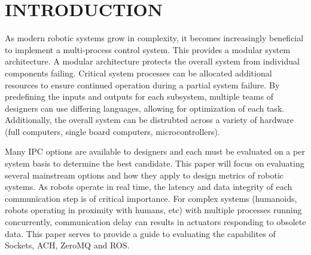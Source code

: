 \section{INTRODUCTION}

As modern robotic systems grow in complexity, it becomes increasingly beneficial to implement a multi-process control system. This provides a modular system architecture. A modular architecture protects the overall system from individual components failing. Critical system processes can be allocated additional resources to ensure continued operation during a partial system failure. By predefining the inputs and outputs for each subsystem, multiple teams of designers can use differing languages, allowing for optimization of each task. Additionally, the overall system can be distrubted across a variety of hardware (full computers, single board computers, microcontrollers). 

Many IPC options are available to designers and each must be evaluated on a per system basis to determine the best candidate. This paper will focus on evaluating several mainstream options and how they apply to design metrics of robotic systems. As robots operate in real time, the latency and data integrity of each communication step is of critical importance. For complex systems (humanoids, robots operating in proximity with humans, etc) with multiple processes running concurrently, communication delay can results in actuators responding to obsolete data. This paper serves to provide a guide to evaluating the capabilites of Sockets, ACH, ZeroMQ and ROS. 
